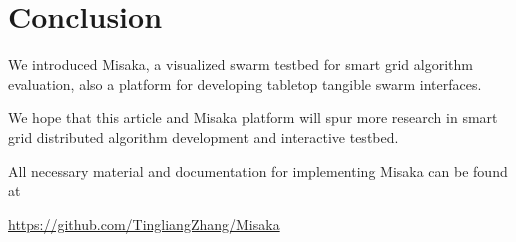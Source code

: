 \documentclass[conference]{IEEEtran}
\begin{document}





\section{Conclusion}

We introduced Misaka, a visualized swarm testbed for smart grid algorithm evaluation, also a platform for developing tabletop tangible swarm interfaces.

We hope that this article and Misaka platform will spur more research in smart grid distributed algorithm development and interactive testbed.

All necessary material and documentation for implementing Misaka can be found at

\href{https://github.com/TingliangZhang/Misaka}{https://github.com/TingliangZhang/Misaka}



\end{document}

